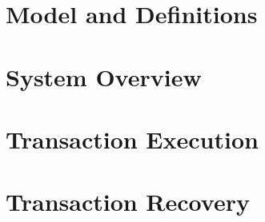 \documentclass[letterpaper,twocolumn,10pt]{article}
\begin{document}
%
%

\section{Model and Definitions}
\label{section:model}

%





\section{System Overview}
\label{section:arch}



%
%



%


\section{Transaction Execution}
\label{section:exec}





\section{Transaction Recovery}
\label{section:rec}
\end{document}
